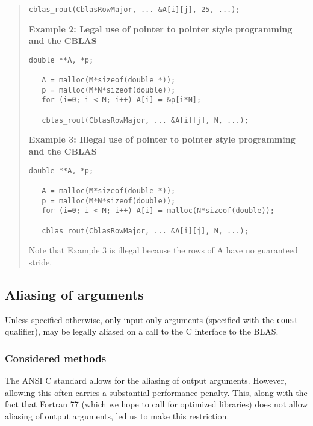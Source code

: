 \documentclass{article}
\begin{document}
{\begin{quotation}
\begin{Verbatim}[fontsize=\small,fontfamily=tt,fontshape=rm]
   cblas_rout(CblasRowMajor, ... &A[i][j], 25, ...);
\end{Verbatim}

\noindent
{\bf Example 2: Legal use of pointer to pointer style programming and the CBLAS}
\begin{Verbatim}[fontsize=\small,fontfamily=tt,fontshape=rm]
   double **A, *p;

   A = malloc(M*sizeof(double *));
   p = malloc(M*N*sizeof(double));
   for (i=0; i < M; i++) A[i] = &p[i*N];

   cblas_rout(CblasRowMajor, ... &A[i][j], N, ...);
\end{Verbatim}

\noindent
{\bf Example 3: Illegal use of pointer to pointer style programming and the CBLAS}
\begin{Verbatim}[fontsize=\small,fontfamily=tt,fontshape=rm]
   double **A, *p;

   A = malloc(M*sizeof(double *));
   p = malloc(M*N*sizeof(double));
   for (i=0; i < M; i++) A[i] = malloc(N*sizeof(double));

   cblas_rout(CblasRowMajor, ... &A[i][j], N, ...);
\end{Verbatim}
   

Note that Example 3 is illegal because the rows of A have no guaranteed stride.
\end{quotation}
}

\subsection{Aliasing of arguments}\label{legacy:c_aliasing}

 
Unless specified otherwise, only input-only arguments (specified with the
{\tt const} qualifier), may be legally aliased on a call to the C interface
to the BLAS.

\subsubsection{Considered methods}
The ANSI C standard allows for the aliasing of output arguments.  However,
allowing this often carries a substantial performance penalty.  This, along
with the fact that Fortran 77 (which we hope to call for optimized libraries)
does not allow aliasing of output arguments, led us to make this restriction.
\end{document}
